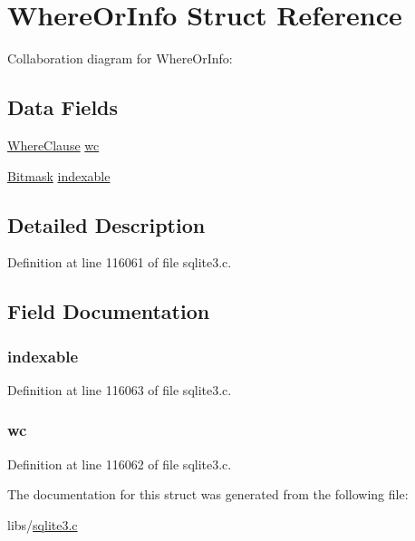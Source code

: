 \hypertarget{struct_where_or_info}{}\section{Where\+Or\+Info Struct Reference}
\label{struct_where_or_info}


Collaboration diagram for Where\+Or\+Info\+:
\subsection*{Data Fields}
\begin{DoxyCompactItemize}
\item 
\hyperlink{struct_where_clause}{Where\+Clause} \hyperlink{struct_where_or_info_a653226586e955747113703770419cf58}{wc}
\item 
\hyperlink{sqlite3_8c_afa77b629897c4457bfdc47d364ba5c3f}{Bitmask} \hyperlink{struct_where_or_info_a4a4f064b341c40f2d5f14ddc7a0ed7cd}{indexable}
\end{DoxyCompactItemize}


\subsection{Detailed Description}


Definition at line 116061 of file sqlite3.\+c.



\subsection{Field Documentation}
\hypertarget{struct_where_or_info_a4a4f064b341c40f2d5f14ddc7a0ed7cd}{}
\subsubsection[{indexable}]{ indexable}\label{struct_where_or_info_a4a4f064b341c40f2d5f14ddc7a0ed7cd}


Definition at line 116063 of file sqlite3.\+c.

\hypertarget{struct_where_or_info_a653226586e955747113703770419cf58}{}
\subsubsection[{wc}]{ wc}\label{struct_where_or_info_a653226586e955747113703770419cf58}


Definition at line 116062 of file sqlite3.\+c.



The documentation for this struct was generated from the following file\+:\begin{DoxyCompactItemize}
\item 
libs/\hyperlink{sqlite3_8c}{sqlite3.\+c}\end{DoxyCompactItemize}

